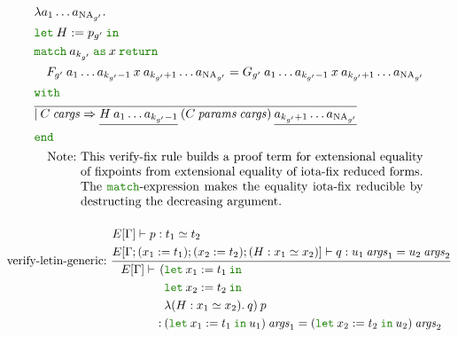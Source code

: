 \documentclass[a4paper,fleqn]{article}
\newcommand{\kwlet}{\mbox{\color{mygreen}\ttfamily let}}
\newcommand{\kwin}{\mbox{\color{mygreen}\ttfamily in}}
\newcommand{\kwmatch}{\mbox{\color{mygreen}\ttfamily match}}
\newcommand{\kwas}{\mbox{\color{mygreen}\ttfamily as}}
\newcommand{\kwreturn}{\mbox{\color{mygreen}\ttfamily return}}
\newcommand{\kwwith}{\mbox{\color{mygreen}\ttfamily with}}
\newcommand{\kwend}{\mbox{\color{mygreen}\ttfamily end}}
\newcommand{\lam}[2]{\lambda #1.\:#2}
\newcommand{\ldefB}[2]{(#1:=#2)}
\DeclareMathOperator{\NA}{NA} %
\newcommand{\breakrule}{\\[0.5em]}
\newcommand{\rep}[1]{\overline{#1}}
\begin{document}
\begin{gather*}
\begin{aligned}[t]
\begin{aligned}[t]
            & \lambda a_1 \ldots a_{\NA_{g'}} . \\
            & \kwlet\:H := p_{g'}\:\kwin \\
            & \kwmatch\:a_{k_{g'}}\:\kwas\:x\:\kwreturn \\
            & \quad F_{g'}\:a_1 \ldots a_{k_{g'}-1}\:x\:a_{k_{g'}+1} \ldots a_{\NA_{g'}} = G_{g'}\:a_1 \ldots a_{k_{g'}-1}\:x\:a_{k_{g'}+1} \ldots a_{\NA_{g'}} \\
            & \kwwith \\
            & \rep{|\:C\:\mathit{cargs} \Rightarrow \underline{H\:a_1 \ldots a_{k_{g'}-1}}\:(C\:\mathit{params}\:\mathit{cargs})\:\underline{a_{k_{g'}+1} \ldots a_{\NA_{g'}}}} \\
            & \kwend
          \end{aligned}
      \end{aligned} \\
    \quad \mbox{Note:}~
      \begin{minipage}[t]{0.8\columnwidth}
        This verify-fix rule builds a proof term for extensional equality of fixpoints from extensional equality of iota-fix reduced forms.
        The \kwmatch-expression makes the equality iota-fix reducible by destructing the decreasing argument.
      \end{minipage}
    \breakrule
\end{gather*}

\begin{gather*}
  \text{verify-letin-generic:}~
    \dfrac{
      \begin{aligned}
        & E[\Gamma] \vdash p : t_1 \simeq t_2 \\
        & E[\Gamma; \ldefB{x_1}{t_1}; \ldefB{x_2}{t_2}; (H : x_1 \simeq x_2)] \vdash q : u_1\:\mathit{args}_1 = u_2\:\mathit{args}_2
      \end{aligned}
    }{
      E[\Gamma] \vdash
        \begin{aligned}[t]
          ( & \kwlet\: x_1 := t_1 \:\kwin \\
            & \kwlet\: x_2 := t_2 \:\kwin \\
            & \lam{(H : x_1 \simeq x_2)}{q})\: p \\
        :\: & (\kwlet\: x_1 := t_1 \:\kwin\: u_1)\:\mathit{args}_1 = (\kwlet\: x_2 := t_2 \:\kwin\: u_2)\:\mathit{args}_2
        \end{aligned}
    } \breakrule
\end{gather*}
\end{document}
